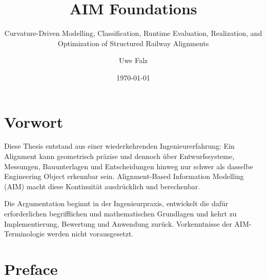 \documentclass[11pt,a4paper,oneside,openany]{scrbook}
\newif\ifaimGerman
\theoremstyle{plain}
\theoremstyle{definition}
\theoremstyle{remark}
\begin{document}
\ifaimGerman
  \selectlanguage{ngerman}
\else
\fi


\frontmatter

\ifaimGerman
  \title{AIM Grundlagen}
  \subtitle{Krümmungsgetriebene Modellierung, Klassifikation,
  Laufzeitbewertung, Realisierung und Optimierung strukturierter
  Eisenbahn-Alignments}
\else
  \title{AIM Foundations}
  \subtitle{Curvature-Driven Modelling, Classification, Runtime Evaluation,
  Realization, and Optimization of Structured Railway Alignments}
\fi

\author{Uwe Falz}
\date{\today}

\maketitle

\cleardoublepage
\thispagestyle{empty}
\begin{center}
\vspace*{0.10\textheight}
\scalebox{2.30}{}
\vspace*{0.08\textheight}
\end{center}
\cleardoublepage

\tableofcontents


\cleardoublepage
\ifaimGerman
\chapter*{Vorwort}
{}

Diese Thesis entstand aus einer wiederkehrenden Ingenieurerfahrung: Ein
Alignment kann geometrisch präzise und dennoch über Entwurfssysteme,
Messungen, Bauunterlagen und Entscheidungen hinweg nur schwer als
dasselbe Engineering Object erkennbar sein. Alignment-Based Information
Modelling (AIM) macht diese Kontinuität ausdrücklich und berechenbar.

Die Argumentation beginnt in der Ingenieurpraxis, entwickelt die dafür
erforderlichen begrifflichen und mathematischen Grundlagen und kehrt zu
Implementierung, Bewertung und Anwendung zurück. Vorkenntnisse der
AIM-Terminologie werden nicht vorausgesetzt.
\else
\chapter*{Preface}
{}
\end{document}
